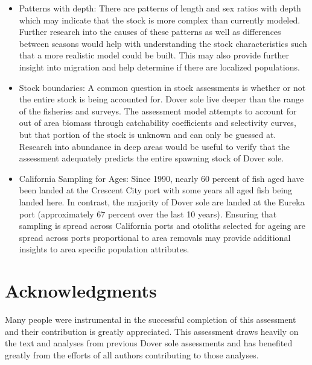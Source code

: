 \documentclass[11pt,
  english,
  a4paper,
]{article}
\begin{document}
\begin{itemize}

\item Patterns with depth:  There are patterns of length and sex ratios with depth which may indicate that the stock is more complex than currently modeled.  Further research into the causes of these patterns as well as differences between seasons would help with understanding the stock characteristics such that a more realistic model could be built.  This may also provide further insight into migration and help determine if there are localized populations.

\item Stock boundaries: A common question in stock assessments is whether or not the entire stock is being accounted for. Dover sole live deeper than the range of the fisheries and surveys.  The assessment model attempts to account for out of area biomass through catchability coefficients and selectivity curves, but that portion of the stock is unknown and can only be guessed at.  Research into abundance in deep areas would be useful to verify that the assessment adequately predicts the entire spawning stock of Dover sole.

\item California Sampling for Ages: Since 1990, nearly 60 percent of fish aged have been landed at the Crescent City port with some years all aged fish being landed here. In contrast, the majority of Dover sole are landed at the Eureka port (approximately 67 percent over the last 10 years). Ensuring that sampling is spread across California ports and otoliths selected for ageing are spread across ports proportional to area removals may provide additional insights to area specific population attributes.

\end{itemize}


\hypertarget{acknowledgments}{%
\section{Acknowledgments}\label{acknowledgments}}

\leavevmode\tagmcend\tagstructend


Many people were instrumental in the successful completion of this assessment and their contribution is greatly appreciated. This assessment draws heavily on the text and analyses from previous Dover sole assessments and has benefited greatly from the efforts of all authors contributing to those analyses.
\end{document}
